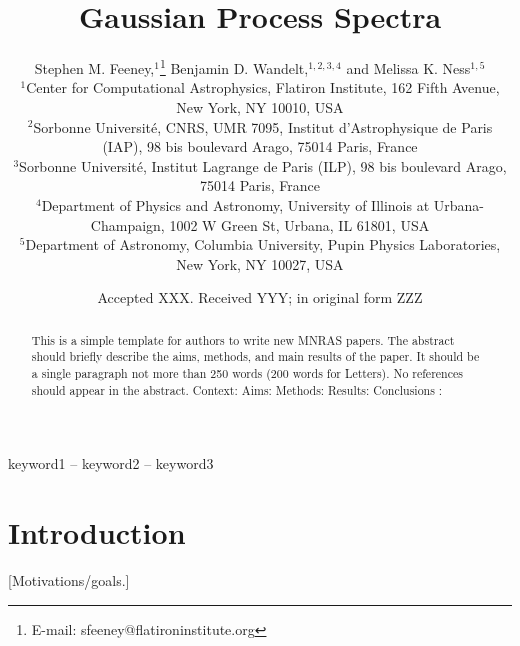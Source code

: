 \documentclass[a4paper,fleqn,usenatbib]{mnras}
\title[Gaussian Process Spectra]{Gaussian Process Spectra}
\author[S. M. Feeney et al.]{
Stephen M. Feeney,$^{1}$\thanks{E-mail: sfeeney@flatironinstitute.org}
Benjamin D. Wandelt,$^{1,2,3,4}$
and Melissa K. Ness$^{1,5}$
\\
$^{1}$Center for Computational Astrophysics, Flatiron Institute, 162 Fifth Avenue, New York, NY 10010, USA\\
$^{2}$Sorbonne Universit\'e, CNRS, UMR 7095,  Institut d'Astrophysique de Paris (IAP), 98 bis boulevard Arago, 75014 Paris, France\\
$^{3}$Sorbonne Universit\'e, Institut Lagrange de Paris (ILP), 98 bis boulevard Arago, 75014 Paris, France\\
$^{4}$Department of Physics and Astronomy, University of Illinois at Urbana-Champaign, 1002 W Green St, Urbana, IL 61801, USA\\
$^{5}$Department of Astronomy, Columbia University, Pupin Physics Laboratories, New York, NY 10027, USA
}
\date{Accepted XXX. Received YYY; in original form ZZZ}
\begin{document}
\label{firstpage}
\pagerange{\pageref{firstpage}--\pageref{lastpage}}
\maketitle

\begin{abstract}
This is a simple template for authors to write new MNRAS papers.
The abstract should briefly describe the aims, methods, and main results of the paper.
It should be a single paragraph not more than 250 words (200 words for Letters).
No references should appear in the abstract.
Context:
Aims: 
Methods:
Results: 
Conclusions :
\end{abstract}

\begin{keywords}
keyword1 -- keyword2 -- keyword3
\end{keywords}


\section{Introduction}

[Motivations/goals.] 
\end{document}
